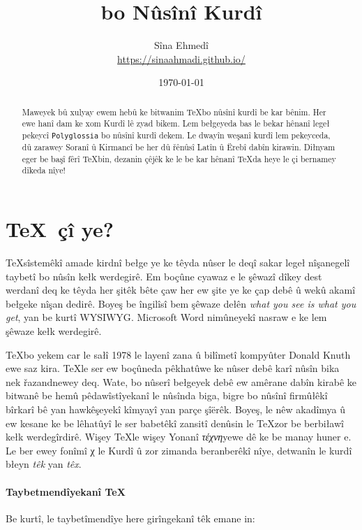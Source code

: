 \documentclass[14pt]{article}
\title{\textenglish{\XeLaTeX} bo Nûsînî Kurdî}
\author{Sîna Ehmedî \\ {\small \url{https://sinaahmadi.github.io/}}}
\date{\today}
\begin{document}
\maketitle
\tableofcontents

\begin{abstract}

Maweyek bû xulyay ewem hebû ke bitwanim \TeX bo nûsînî kurdî be kar bênim. Her ewe hanî dam ke xom Kurdî lê zyad bikem. Lem bełgeyeda bas le bekar hênanî \XeLaTeX legeł pekeycî \texttt{Polyglossia} bo nûsînî kurdî dekem. Le dwayîn weşanî kurdî lem pekeyceda, dû zarawey Soranî û Kirmancî be her dû řênûsî Latîn û Ërebî dabîn kirawin. Diłnyam eger be başî fêrî \TeX bin, dezanin çêjêk ke le be kar hênanî \TeX da heye le çi bernamey dîkeda nîye!

\end{abstract}


\section{\TeX~çî ye?}

\TeX sîstemêkî amade kirdnî bełge ye ke têyda nûser le deqî sakar legeł nîşanegelî taybetî bo nûsîn kełk werdegirê. Em boçûne cyawaz e le şêwazî dîkey dest werdanî deq ke têyda her şitêk bête çaw her ew şite ye ke çap debê û wekû akamî bełgeke nîşan dedirê. Boyeş be îngilîsî bem şêwaze dełên \textit{what you see is what you get}, yan be kurtî \textsc{WYSIWYG}. Microsoft Word nimûneyekî nasraw e ke lem şêwaze kełk werdegirê.

\TeX bo yekem car le sałî 1978 le layenî zana û bilîmetî kompyûter Donald Knuth ewe saz kira. \TeX le ser ew boçûneda pêkhatûwe ke nûser debê karî nûsîn bika nek řazandnewey deq. Wate, bo nûserî bełgeyek debê ew amêrane dabîn kirabê ke bitwanê be hemû pêdawîstîyekanî le nûsînda biga, bigre bo nûsînî firmûłêkî bîrkarî bê yan hawkêşeyekî kîmyayî yan parçe şîërêk. Boyeş, le nêw akadîmya û ew kesane ke be lêhatûyî le ser babetêkî zansitî denûsin le \TeX zor be berbiławî kełk werdegîrdirê. Wişey \TeX le wişey Yonanî \textgreek{\textit{τέχνη}}yewe dê ke be manay huner e. Le ber ewey fonîmî \textgreek{χ} le Kurdî û zor zimanda beranberêkî nîye, detwanîn le kurdî błeyn \textit{têk} yan \textit{têx}.

\paragraph{Taybetmendîyekanî \TeX}
Be kurtî, le taybetîmendîye here girîngekanî têk emane in:
 
\end{document}
